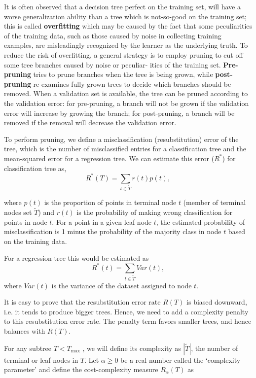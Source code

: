 It is often observed that a decision tree perfect on the training set, will have
a worse generalization ability than a tree which is not-so-good on the training
set; this is called \textbf{overfitting} which may be caused by the fact that
some peculiarities of the training data, such as those caused by noise in
collecting training examples, are misleadingly recognized by the learner as the
underlying truth. To reduce the risk of overfitting, a general strategy is to
employ pruning to cut off some tree branches caused by noise or peculiar- ities
of the training set. \textbf{Pre-pruning} tries to prune branches when the tree
is being grown, while \textbf{post-pruning} re-examines fully grown trees to
decide which branches should be removed. When a validation set is available, the
tree can be pruned according to the validation error: for pre-pruning, a branch
will not be grown if the validation error will increase by growing the branch;
for post-pruning, a branch will be removed if the removal will decrease the
validation error.

To perform pruning, we define a misclassification (resubstitution) error of the
tree, which is the number of misclassified entries for a classification tree and
the mean-squared error for a regression tree. We can estimate this error ($R^*$)
for classification tree as,
$$
    R^*(T) = \sum_{t \in \tilde{T}} r(t) p(t),
$$

where $p(t)$ is the proportion of points in terminal node $t$ (member of
terminal nodes set $\tilde{T}$) and $r(t)$ is the probability of making wrong
classification for points in node $t$. For a point in a given leaf node $t$, the
estimated probability of misclassification is 1 minus the probability of the
majority class in node $t$ based on the training data.

For a regression tree this would be estimated as
$$
    R^*(t) = \sum_{t \in \tilde{T}} Var(t),
$$
where $Var(t)$ is the variance of the dataset assigned to node $t$.

It is easy to prove that the resubstitution error rate $R(T)$ is biased downward,
i.e. it tends to produce bigger trees. Hence, we need to add a complexity penalty
to this resubstitution error rate. The penalty term favors smaller trees, and
hence balances with $R(T)$.

For any subtree $T < T_{\text{max}}$ , we will define its complexity as
$|\tilde{T}|$, the number of terminal or leaf nodes in $T$. Let $\alpha \ge 0$
be a real number called the `complexity parameter' and define the cost-complexity
measure $R_{\alpha}(T)$ as

